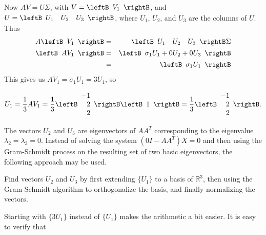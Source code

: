 \begin{solution}
Now $AV=U\Sigma$, with
$V=\leftB\begin{array}{r} V_1 \end{array}\rightB$,
and $U=\leftB\begin{array}{rrr} U_1 & U_2 & U_3 \end{array}\rightB$,
where $U_1$, $U_2$, and $U_3$ are the columns of $U$.
Thus
\begin{eqnarray*}
A\leftB\begin{array}{r} V_1 \end{array}\rightB
&=& \leftB\begin{array}{rrr} U_1 & U_2 & U_3 \end{array}\rightB\Sigma\\
\leftB\begin{array}{r} AV_1 \end{array}\rightB
&=& \leftB\begin{array}{r} \sigma_1 U_1+0U_2+0U_3 \end{array}\rightB\\
&=& \leftB\begin{array}{r} \sigma_1 U_1 \end{array}\rightB
\end{eqnarray*}
This gives us $AV_1=\sigma_1 U_1= 3U_1$, so

\[ U_1 = \frac{1}{3}AV_1 
= \frac{1}{3}
\leftB\begin{array}{r} -1 \\ 2 \\ 2 \end{array}\rightB
\leftB\begin{array}{r} 1 \end{array}\rightB
= \frac{1}{3}
\leftB\begin{array}{r} -1 \\ 2 \\ 2 \end{array}\rightB.\]

The vectors $U_2$ and $U_3$ are eigenvectors of $AA^T$ corresponding
to the eigenvalue $\lambda_2=\lambda_3=0$.
Instead of solving the system $(0I-AA^T)X= 0$ and then using the
Gram-Schmidt process on the resulting set of
two basic eigenvectors, the following approach may be used.

Find vectors $U_2$ and $U_3$ by first extending $\{ U_1\}$ to a basis of
$\mathbb{R}^3$, then using the Gram-Schmidt algorithm to orthogonalize the basis,
and finally normalizing the vectors.

Starting with $\{ 3U_1 \}$ instead of $\{ U_1 \}$ makes the
arithmetic a bit easier.
It is easy to verify that


\end{solution}
